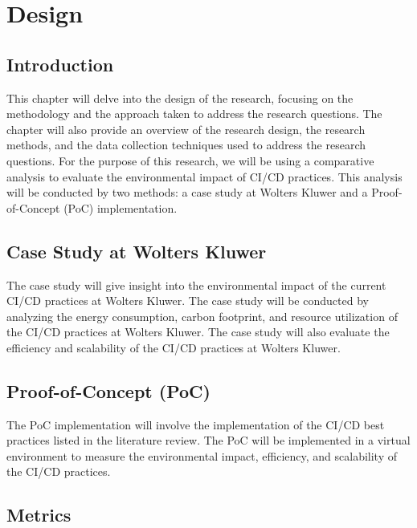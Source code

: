 
\chapter{Design}%
\label{ch:design}

\section{Introduction}%
\label{sec:introduction-design}

This chapter will delve into the design of the research, focusing on the methodology and the approach taken to address the research questions. The chapter will also provide an overview of the research design, the research methods, and the data collection techniques used to address the research questions. For the purpose of this research, we will be using a comparative analysis to evaluate the environmental impact of CI/CD practices. This analysis will be conducted by two methods: a case study at Wolters Kluwer and a Proof-of-Concept (PoC) implementation.

\section{Case Study at Wolters Kluwer}%
\label{sec:case-study}
The case study will give insight into the environmental impact of the current CI/CD practices at Wolters Kluwer. The case study will be conducted by analyzing the energy consumption, carbon footprint, and resource utilization of the CI/CD practices at Wolters Kluwer. The case study will also evaluate the efficiency and scalability of the CI/CD practices at Wolters Kluwer.

\section{Proof-of-Concept (PoC)}%
\label{sec:poc}
The PoC implementation will involve the implementation of the CI/CD best practices listed in the literature review. The PoC will be implemented in a virtual environment to measure the environmental impact, efficiency, and scalability of the CI/CD practices. 

\section{Metrics}%
\label{sec:metrics}

